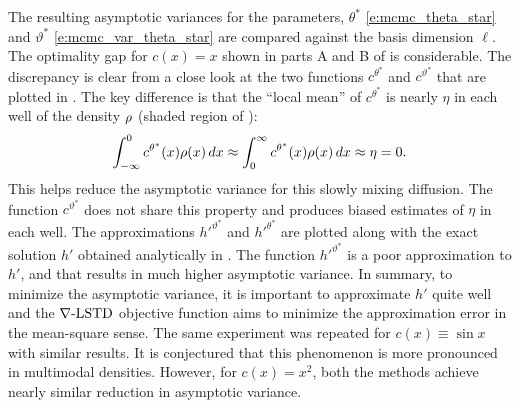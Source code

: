 The resulting asymptotic variances for the parameters, $\theta^*$ \eqref{e:mcmc_theta_star} and $\vartheta^*$ \eqref{e:mcmc_var_theta_star} are compared against the basis dimension $\ell$.  The optimality gap for $c(x) = x$ shown in parts A and B of  is considerable.
The discrepancy is clear from a close look at the two functions $c^{\theta^*}$ and $c^{\vartheta^*}$ that are plotted in . The key difference is that the ``local mean'' of $c^{\theta^*}$ is nearly $\eta$ in each well of the density $\rho$ (shaded region of ):
\[
\begin{aligned}
\int_{-\infty}^0 c^{\theta^*}(x) \rho(x)\, dx	
\approx
\int_0^\infty c^{\theta^*}(x) \rho(x) \, dx \approx \eta =0.
\end{aligned}
\]
This helps reduce the asymptotic variance for this slowly mixing diffusion. The function $c^{\vartheta^*}$  does not share this property and produces biased estimates of $\eta$ in each well.
The approximations $h'^{\vartheta^*}$ and $h'^{\theta^*}$ are plotted along with the exact solution $h'$ obtained analytically in
.  The function $h'^{\vartheta^*}$ is a poor approximation to $h'$,  and that results in much higher asymptotic variance. In summary, to minimize the asymptotic variance, it is  important to approximate $h'$ quite well and the $\nabla\text{-LSTD}$ objective function aims to minimize the approximation error in the mean-square sense. The same experiment was repeated for $c(x) \equiv\sin x$ with similar results. It is conjectured that this phenomenon is more pronounced in multimodal densities. However, for $c(x) = x^2$, both the methods achieve nearly similar reduction in asymptotic variance. 

